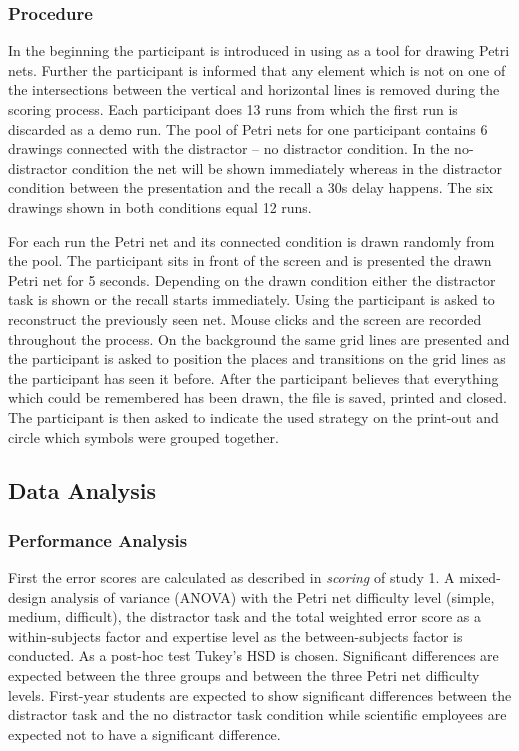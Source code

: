 \subsubsection{Procedure}
In the beginning the participant is introduced in using  \cite{renew} as a tool for drawing Petri nets.
Further the participant is informed that any element which is not on one of the intersections between the vertical and horizontal lines is removed during the scoring process.
Each participant does 13 runs from which the first run is discarded as a demo run.
The pool of Petri nets for one participant contains 6 drawings connected with the distractor -- no distractor condition.
In the no-distractor condition the net will be shown immediately whereas in the distractor condition between the presentation and the recall a 30s delay happens.
The six drawings shown in both conditions equal 12 runs.

For each run the Petri net and its connected condition is drawn randomly from the pool.
The participant sits in front of the screen and is presented the drawn Petri net for 5 seconds.
Depending on the drawn condition either the distractor task is shown or the recall starts immediately.
Using  the participant is asked to reconstruct the previously seen net.
Mouse clicks and the screen are recorded throughout the process.
On the background the same grid lines are presented and the participant is asked to position the places and transitions on the grid lines as the participant has seen it before.
After the participant believes that everything which could be remembered has been drawn, the file is saved, printed and closed.
The participant is then asked to indicate the used strategy on the print-out and circle which symbols were grouped together.

\subsection{Data Analysis}

\subsubsection{Performance Analysis}

First the error scores are calculated as described in \textit{scoring} of study 1.
A mixed-design analysis of variance (ANOVA) with 
the Petri net difficulty level (simple, medium, difficult),
the distractor task and
the total weighted error score
as a within-subjects factor and 
expertise level
as the between-subjects factor is conducted.
As a post-hoc test Tukey's HSD is chosen.
Significant differences are expected between the three groups and between the three Petri net difficulty levels.
First-year students are expected to show significant differences between the distractor task and the no distractor task condition while scientific employees are expected not to have a significant difference.

